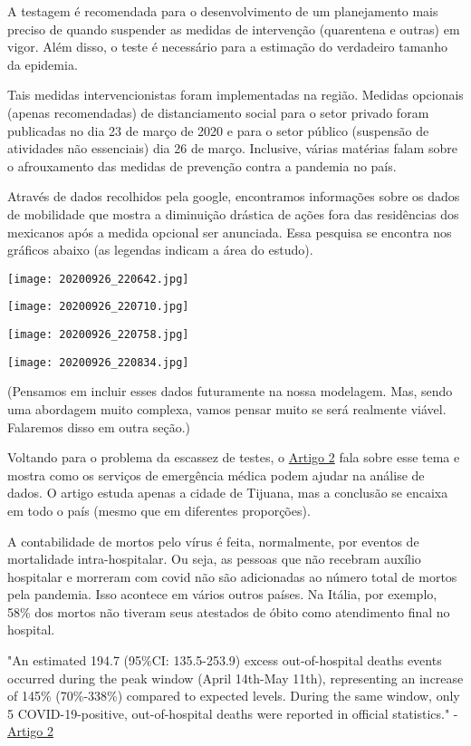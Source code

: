 \documentclass{article}
\begin{document}
A testagem é recomendada para o desenvolvimento de um planejamento mais preciso de quando suspender as medidas de intervenção (quarentena e outras) em vigor. Além disso, o teste é necessário para a estimação do verdadeiro tamanho da epidemia. 

Tais medidas intervencionistas foram implementadas na região. Medidas opcionais (apenas recomendadas) de distanciamento social para o setor privado foram publicadas no dia 23 de março de 2020 e para o setor público (suspensão de atividades não essenciais) dia 26 de março. Inclusive, várias matérias falam sobre o afrouxamento das medidas de prevenção contra a pandemia no país. 

Através de dados recolhidos pela google, encontramos informações sobre os dados de mobilidade que mostra a diminuição drástica de ações fora das residências dos mexicanos após a medida opcional ser anunciada. Essa pesquisa se encontra nos gráficos abaixo (as legendas indicam a área do estudo).

\texttt{[image: 20200926\_220642.jpg]}

\texttt{[image: 20200926\_220710.jpg]}

\texttt{[image: 20200926\_220758.jpg]}

\texttt{[image: 20200926\_220834.jpg]}

(Pensamos em incluir esses dados futuramente na nossa modelagem. Mas, sendo uma abordagem muito complexa, vamos pensar muito se será realmente viável. Falaremos disso em outra seção.)

Voltando para o problema da escassez de testes, o \href{https://www.sciencedirect.com/science/article/pii/S0196064420306016}{Artigo 2} fala sobre esse tema e mostra como os serviços de emergência médica podem ajudar na análise de dados. O artigo estuda apenas a cidade de Tijuana, mas a conclusão se encaixa em todo o país (mesmo que em diferentes proporções). 

A contabilidade de mortos pelo vírus é feita, normalmente, por eventos de mortalidade intra-hospitalar. Ou seja, as pessoas que não recebram auxílio hospitalar e morreram com covid não são adicionadas ao número total de mortos pela pandemia. Isso acontece em vários outros países. Na Itália, por exemplo, 58\% dos mortos não tiveram seus atestados de óbito como atendimento final no hospital.

\begin{center}
    "An estimated 194.7 (95\%CI: 135.5-253.9) excess out-of-hospital deaths events occurred during
the peak window (April 14th-May 11th), representing an increase of 145\% (70\%-338\%) compared to
expected levels. During the same window, only 5 COVID-19-positive, out-of-hospital deaths were
reported in official statistics." - \href{https://www.sciencedirect.com/science/article/pii/S0196064420306016}{Artigo 2}
\end{center}
\end{document}
